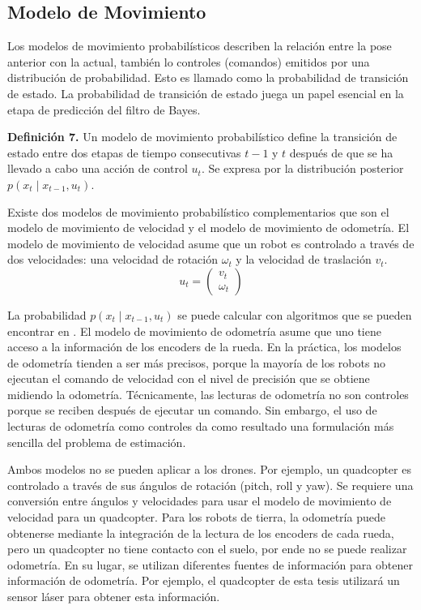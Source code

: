 \subsection{Modelo de Movimiento}

Los modelos de movimiento probabilísticos describen la relación entre la pose anterior con la actual, también lo controles (comandos) emitidos por una distribución de probabilidad. Esto es llamado como la probabilidad de transición de estado. La probabilidad de transición de estado juega un papel esencial en la etapa de predicción del filtro de Bayes.

\textbf{Definición 7.} Un modelo de movimiento probabilístico define la transición de estado entre dos etapas de tiempo consecutivas $t-1$ y $t$ después de que se ha llevado a cabo una acción de control $u_{t}$. Se expresa por la distribución posterior $p(x_{t}\mid x_{t-1}, u_{t})$.

Existe dos modelos de movimiento probabilístico complementarios que son el modelo de movimiento de velocidad y el modelo de movimiento de odometría. El modelo de movimiento de velocidad asume que un robot es controlado a través de dos velocidades: una velocidad de rotación $\omega_{t}$ y la velocidad de traslación $v_{t}$.
\begin{equation}
u_{t} = \begin{pmatrix}
v_{t} \\
\omega_{t}
\end{pmatrix}
\end{equation}

La probabilidad $p(x_{t}\mid x_{t-1}, u_{t})$ se puede calcular con algoritmos que se pueden encontrar en \cite{Thrun2005}. El modelo de movimiento de odometría asume que uno tiene acceso a la información de los encoders de la rueda. En la práctica, los modelos de odometría tienden a ser más precisos, porque la mayoría de los robots no ejecutan el comando de velocidad con el nivel de precisión que se obtiene midiendo la odometría. Técnicamente, las lecturas de odometría no son controles porque se reciben después de ejecutar un comando. Sin embargo, el uso de lecturas de odometría como controles da como resultado una formulación más sencilla del problema de estimación.

Ambos modelos no se pueden aplicar a los drones. Por ejemplo, un quadcopter es controlado a través de sus ángulos de rotación (pitch, roll y yaw). Se requiere una conversión entre ángulos y velocidades para usar el modelo de movimiento de velocidad para un quadcopter. Para los robots de tierra, la odometría puede obtenerse mediante la integración de la lectura de los encoders de cada rueda, pero un quadcopter no tiene contacto con el suelo, por ende no se puede realizar odometría. En su lugar, se utilizan diferentes fuentes de información para obtener información de odometría. Por ejemplo, el quadcopter de esta tesis utilizará un sensor láser para obtener esta información.

